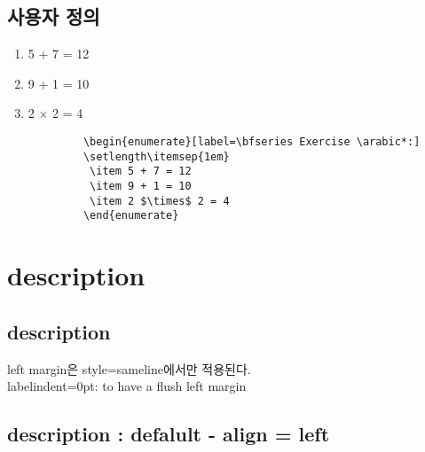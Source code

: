 \documentclass[12pt, a4paper, oneside]{book}
\let\stdsection\section
\renewcommand\section{\newpage\stdsection}
\begin{document}
	\section{사용자 정의}

			\begin{enumerate}[label=\bfseries Exercise \arabic*:]
			\setlength\itemsep{1em}
			 \item 5 + 7 = 12
			 \item 9 + 1 = 10
			 \item 2 $\times$ 2 = 4
			\end{enumerate}


		\begin{mdframed}[style=code_document, frametitle={code}]
			\begin{verbatim}
			\begin{enumerate}[label=\bfseries Exercise \arabic*:]
			\setlength\itemsep{1em}
			 \item 5 + 7 = 12
			 \item 9 + 1 = 10
			 \item 2 $\times$ 2 = 4
			\end{enumerate}
			\end{verbatim}
		\end{mdframed}



	\chapter{description}


	\section{description}


			left margin은 style=sameline에서만 적용된다.  \\

			labelindent=0pt: to have a flush left margin



	\section{description : defalult - align = left}
\end{document}
